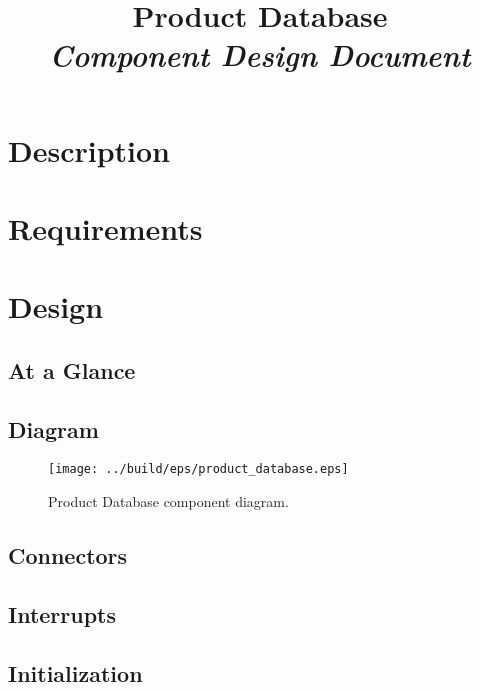 



\title{\textbf{Product Database} \\
\large\textit{Component Design Document}}
\date{}
\maketitle

\section{Description}


\section{Requirements}


\section{Design}

\subsection{At a Glance}


\subsection{Diagram}
\begin{figure}[H]
  \texttt{[image: ../build/eps/product\_database.eps]}
  \caption{Product Database component diagram.}
\end{figure}

\subsection{Connectors}


\subsection{Interrupts}



\subsection{Initialization}


